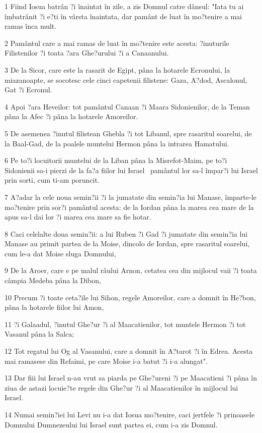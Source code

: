 \par 1 Fiind Iosua batrân ?i înaintat în zile, a zis Domnul catre dânsul: "Iata tu ai îmbatrânit ?i e?ti în vârsta înaintata, dar pamânt de luat în mo?tenire a mai ramas înca mult.
\par 2 Pamântul care a mai ramas de luat în mo?tenire este acesta: ?inuturile Filistenilor ?i toata ?ara Ghe?urului ?i a Canaanului.
\par 3 De la Sicor, care este la rasarit de Egipt, pâna la hotarele Ecronului, la miazanoapte, se socotesc cele cinci capetenii filistene: Gaza, A?dod, Ascalonul, Gat ?i Ecronul.
\par 4 Apoi ?ara Heveilor: tot pamântul Canaan ?i Maara Sidonienilor, de la Teman pâna la Afec ?i pâna la hotarele Amoreilor.
\par 5 De asemenea ?inutul filistean Ghebla ?i tot Libanul, spre rasaritul soarelui, de la Baal-Gad, de la poalele muntelui Hermon pâna la intrarea Hamatului.
\par 6 Pe to?i locuitorii muntelui de la Liban pâna la Misrefot-Maim, pe to?i Sidonienii sa-i pierzi de la fa?a fiilor lui Israel  pamântul lor sa-l împar?i lui Israel prin sorti, cum ti-am poruncit.
\par 7 A?adar la cele noua semin?ii ?i la jumatate din semin?ia lui Manase, împarte-le mo?tenire prin sor?i pamântul acesta: de la Iordan pâna la marea cea mare de la apus sa-l dai lor ?i marea cea mare sa fie hotar.
\par 8 Caci celelalte doua semin?ii: a lui Ruben ?i Gad ?i jumatate din semin?ia lui Manase au primit partea de la Moise, dincolo de Iordan, spre rasaritul soarelui, cum le-a dat Moise sluga Domnului,
\par 9 De la Aroer, care e pe malul râului Arnon, cetatea cea din mijlocul vaii ?i toata câmpia Medeba pâna la Dibon,
\par 10 Precum ?i toate ceta?ile lui Sihon, regele Amoreilor, care a domnit în He?bon, pâna la hotarele fiilor lui Amon,
\par 11 ?i Galaadul, ?inutul Ghe?ur ?i al Maacatienilor, tot muntele Hermon ?i tot Vasanul pâna la Salca;
\par 12 Tot regatul lui Og al Vasanului, care a domnit în A?tarot ?i în Edrea. Acesta mai ramasese din Refaimi, pe care Moise i-a batut ?i i-a alungat".
\par 13 Dar fiii lui Israel n-au vrut sa piarda pe Ghe?ureni ?i pe Maacatieni ?i pâna în ziua de astazi locuie?te regele din Ghe?ur ?i al Maacatienilor în mijlocul lui Israel.
\par 14 Numai semin?iei lui Levi nu i-a dat Iosua mo?tenire, caci jertfele ?i prinoasele Domnului Dumnezeului lui Israel sunt partea ei, cum i-a zis Domnul.

